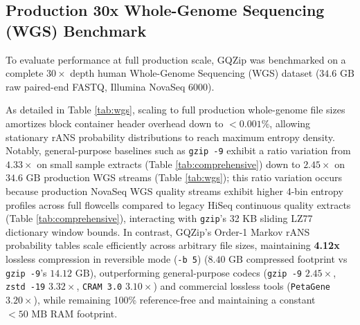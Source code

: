 \documentclass[10pt,twocolumn,a4paper]{article}
\begin{document}
\subsection{Production 30x Whole-Genome Sequencing (WGS) Benchmark}
To evaluate performance at full production scale, GQZip was benchmarked on a complete $30\times$ depth human Whole-Genome Sequencing (WGS) dataset ($34.6\text{ GB}$ raw paired-end FASTQ, Illumina NovaSeq 6000).

As detailed in Table \ref{tab:wgs}, scaling to full production whole-genome file sizes amortizes block container header overhead down to $<0.001\%$, allowing stationary rANS probability distributions to reach maximum entropy density. Notably, general-purpose baselines such as \texttt{gzip -9} exhibit a ratio variation from $4.33\times$ on small sample extracts (Table \ref{tab:comprehensive}) down to $2.45\times$ on $34.6\text{ GB}$ production WGS streams (Table \ref{tab:wgs}); this ratio variation occurs because production NovaSeq WGS quality streams exhibit higher 4-bin entropy profiles across full flowcells compared to legacy HiSeq continuous quality extracts (Table \ref{tab:comprehensive}), interacting with \texttt{gzip}'s 32 KB sliding LZ77 dictionary window bounds. In contrast, GQZip's Order-1 Markov rANS probability tables scale efficiently across arbitrary file sizes, maintaining \textbf{4.12x} lossless compression in reversible mode (\texttt{-b 5}) ($8.40\text{ GB}$ compressed footprint vs \texttt{gzip -9}'s $14.12\text{ GB}$), outperforming general-purpose codecs (\texttt{gzip -9} $2.45\times$, \texttt{zstd -19} $3.32\times$, \texttt{CRAM 3.0} $3.10\times$) and commercial lossless tools (\texttt{PetaGene} $3.20\times$), while remaining 100\% reference-free and maintaining a constant $<50\text{ MB}$ RAM footprint.
\end{document}
